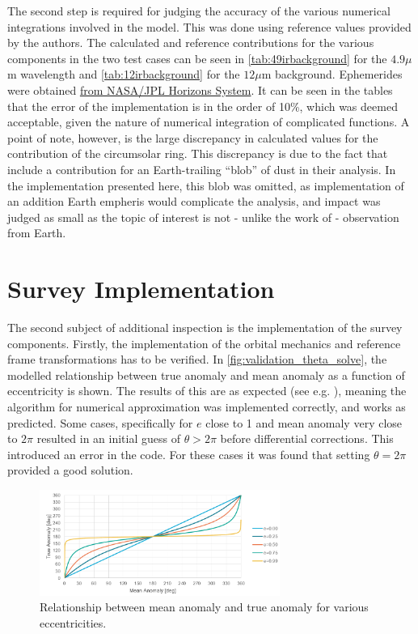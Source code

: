 The second step is required for judging the accuracy of the various numerical integrations involved in the model. This was done using reference values provided by the authors. The calculated and reference contributions for the various components in the two test cases can be seen in \autoref{tab:49irbackground} for the $4.9 \mu$m wavelength and \autoref{tab:12irbackground} for the $12 \mu$m background. Ephemerides were obtained \href{https://ssd.jpl.nasa.gov/horizons/}{from NASA/JPL Horizons System}. It can be seen in the tables that the error of the implementation is in the order of 10\%, which was deemed acceptable, given the nature of numerical integration of complicated functions. A point of note, however, is the large discrepancy in calculated values for the contribution of the circumsolar ring. This discrepancy is due to the fact that \cite{IRDust} include a contribution for an Earth-trailing ``blob'' of dust in their analysis. In the implementation presented here, this blob was omitted, as implementation of an addition Earth empheris would complicate the analysis, and impact was judged as small as the topic of interest is not - unlike the work of \cite{IRDust} - observation from Earth.

\section{Survey Implementation}
\label{sec:vvsurvey}
The second subject of additional inspection is the implementation of the survey components. Firstly, the implementation of the orbital mechanics and reference frame transformations has to be verified. In \autoref{fig:validation_theta_solve}, the modelled relationship between true anomaly and mean anomaly as a function of eccentricity is shown. The results of this are as expected (see e.g. \cite{Curtis}), meaning the algorithm for numerical approximation was implemented correctly, and works as predicted. Some cases, specifically for $e$ close to 1 and mean anomaly very close to $2\pi$ resulted in an initial guess of $\theta > 2\pi$ before differential corrections. This introduced an error in the code. For these cases it was found that setting $\theta = 2\pi$ provided a good solution. \\

\begin{figure}[htbp]
 \centering
 \includegraphics[width=0.7\textwidth]{img/validation_theta_solve.png}
 \caption{Relationship between mean anomaly and true anomaly for various eccentricities.}
 \label{fig:validation_theta_solve}
\end{figure}

